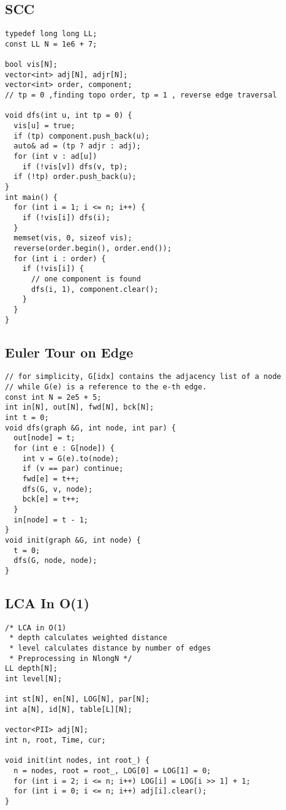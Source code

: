 \documentclass[FSZ,a4paper,onesided]{article}
\begin{document}
\begin{multicols*}{\COLS}
\subsection{SCC}
\begin{lstlisting}
typedef long long LL;
const LL N = 1e6 + 7;

bool vis[N];
vector<int> adj[N], adjr[N];
vector<int> order, component;
// tp = 0 ,finding topo order, tp = 1 , reverse edge traversal

void dfs(int u, int tp = 0) {
  vis[u] = true;
  if (tp) component.push_back(u);
  auto& ad = (tp ? adjr : adj);
  for (int v : ad[u])
    if (!vis[v]) dfs(v, tp);
  if (!tp) order.push_back(u);
}
int main() {
  for (int i = 1; i <= n; i++) {
    if (!vis[i]) dfs(i);
  }
  memset(vis, 0, sizeof vis);
  reverse(order.begin(), order.end());
  for (int i : order) {
    if (!vis[i]) {
      // one component is found
      dfs(i, 1), component.clear();
    }
  }
}

\end{lstlisting}
\subsection{Euler Tour on Edge}
\begin{lstlisting}
// for simplicity, G[idx] contains the adjacency list of a node
// while G(e) is a reference to the e-th edge.
const int N = 2e5 + 5;
int in[N], out[N], fwd[N], bck[N];
int t = 0;
void dfs(graph &G, int node, int par) {
  out[node] = t;
  for (int e : G[node]) {
    int v = G(e).to(node);
    if (v == par) continue;
    fwd[e] = t++;
    dfs(G, v, node);
    bck[e] = t++;
  }
  in[node] = t - 1;
}
void init(graph &G, int node) {
  t = 0;
  dfs(G, node, node);
}
\end{lstlisting}
\subsection{LCA In O(1)}
\begin{lstlisting}
/* LCA in O(1)
 * depth calculates weighted distance
 * level calculates distance by number of edges
 * Preprocessing in NlongN */
LL depth[N];
int level[N];

int st[N], en[N], LOG[N], par[N];
int a[N], id[N], table[L][N];

vector<PII> adj[N];
int n, root, Time, cur;

void init(int nodes, int root_) {
  n = nodes, root = root_, LOG[0] = LOG[1] = 0;
  for (int i = 2; i <= n; i++) LOG[i] = LOG[i >> 1] + 1;
  for (int i = 0; i <= n; i++) adj[i].clear();
}


\end{lstlisting}
\end{multicols*}
\end{document}
